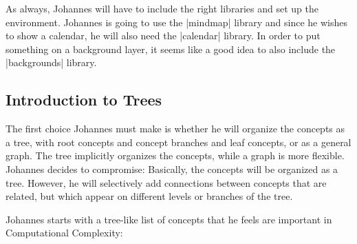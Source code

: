 As always, Johannes will have to include the right libraries and
set up the environment. Johannes is going to use the
|mindmap| library and since he wishes to show a calendar, he will also need
the |calendar| library. In order to put something
on a background layer, it seems like a good idea to also include the
|backgrounds| library.


\subsection{Introduction to Trees}

The first choice Johannes must make is whether he will organize the
concepts as a tree, with root concepts and concept branches and leaf
concepts, or as a general graph. The tree implicitly organizes the
concepts, while a graph is more flexible. Johannes decides to
compromise: Basically, the concepts will be organized as a
tree. However, he will selectively add connections between concepts
that are related, but which appear on different levels or branches of
the tree.

Johannes starts with a tree-like list of concepts that he feels are
important in Computational Complexity:

